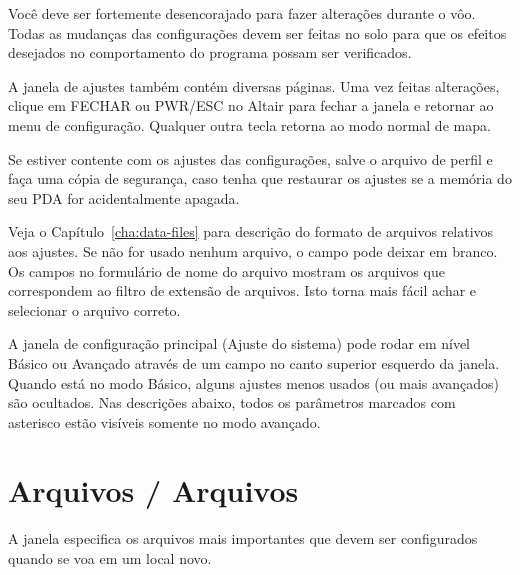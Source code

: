 Você deve ser fortemente desencorajado para fazer alterações durante o vôo.  Todas as mudanças das configurações devem ser feitas no solo para que os efeitos desejados no comportamento do programa possam ser verificados.

A janela de ajustes também contém diversas páginas.  Uma vez feitas alterações, clique em FECHAR ou PWR/ESC no Altair para fechar a janela e retornar ao menu de configuração.  Qualquer outra tecla retorna ao modo normal de mapa.

\tip Se estiver contente com os ajustes das configurações, salve o arquivo de perfil e faça uma cópia de segurança, caso tenha que restaurar os ajustes se a memória do seu PDA for acidentalmente apagada.

Veja o Capítulo~\ref{cha:data-files} para descrição do formato de arquivos relativos aos ajustes.  Se não for usado nenhum arquivo, o campo pode deixar em branco.  Os campos no formulário de nome do arquivo mostram os arquivos que correspondem ao filtro de extensão de arquivos.  Isto torna mais fácil achar e selecionar o arquivo correto.

A janela de configuração principal (Ajuste do sistema) pode rodar em nível Básico ou Avançado através de um campo no canto superior esquerdo da janela.  
Quando está no modo Básico, alguns ajustes menos usados (ou mais avançados) são ocultados.  Nas descrições abaixo, todos os parâmetros marcados com asterisco estão visíveis somente no modo avançado.

\section{Arquivos / Arquivos}
A janela especifica os arquivos mais importantes que devem ser configurados quando se voa em um local novo.

